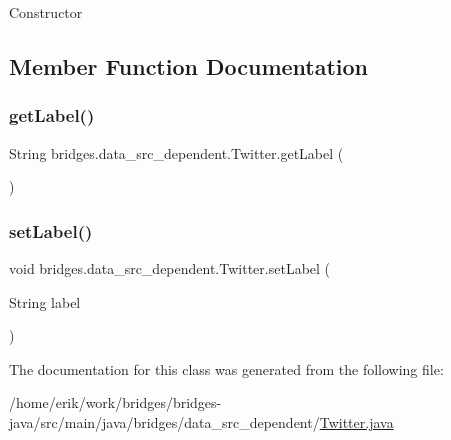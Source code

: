 Constructor 

\subsection{Member Function Documentation}
\mbox{\label{classbridges_1_1data__src__dependent_1_1_twitter_ac7d7ac0808192702bc4a1a790237da8b}} 
\subsubsection{\texorpdfstring{get\+Label()}{getLabel()}}
{\footnotesize\ttfamily String bridges.\+data\+\_\+src\+\_\+dependent.\+Twitter.\+get\+Label (\begin{DoxyParamCaption}{ }\end{DoxyParamCaption})}

\mbox{\label{classbridges_1_1data__src__dependent_1_1_twitter_a4d7d3a015d66029f373d5c8e41659242}} 
\subsubsection{\texorpdfstring{set\+Label()}{setLabel()}}
{\footnotesize\ttfamily void bridges.\+data\+\_\+src\+\_\+dependent.\+Twitter.\+set\+Label (\begin{DoxyParamCaption}\item[{String}]{label }\end{DoxyParamCaption})}



The documentation for this class was generated from the following file\+:\begin{DoxyCompactItemize}
\item 
/home/erik/work/bridges/bridges-\/java/src/main/java/bridges/data\+\_\+src\+\_\+dependent/\hyperlink{_twitter_8java}{Twitter.\+java}\end{DoxyCompactItemize}
